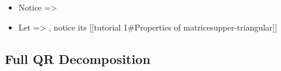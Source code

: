 \begin{itemize}
        \begin{itemize}

          \item
                Notice =\textgreater{}
          \item
                Let
                =\textgreater{}
                ,
                notice its {[}{[}tutorial 1\#Properties of
                matrices\textbar upper-triangular{]}{]}
        \end{itemize}
\end{itemize}

\subsection*{Full QR Decomposition}

